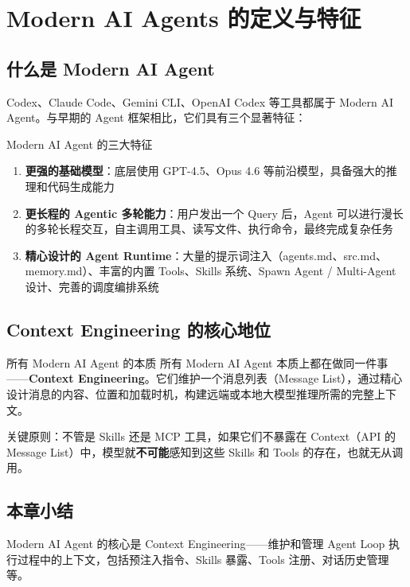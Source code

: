 \section{Modern AI Agents 的定义与特征}

\subsection{什么是 Modern AI Agent}

Codex、Claude Code、Gemini CLI、OpenAI Codex 等工具都属于 Modern AI Agent。与早期的 Agent 框架相比，它们具有三个显著特征：

\begin{importantbox}{Modern AI Agent 的三大特征}
\begin{enumerate}
    \item \textbf{更强的基础模型}：底层使用 GPT-4.5、Opus 4.6 等前沿模型，具备强大的推理和代码生成能力
    \item \textbf{更长程的 Agentic 多轮能力}：用户发出一个 Query 后，Agent 可以进行漫长的多轮长程交互，自主调用工具、读写文件、执行命令，最终完成复杂任务
    \item \textbf{精心设计的 Agent Runtime}：大量的提示词注入（agents.md、src.md、memory.md）、丰富的内置 Tools、Skills 系统、Spawn Agent / Multi-Agent 设计、完善的调度编排系统
\end{enumerate}
\end{importantbox}

\subsection{Context Engineering 的核心地位}

\begin{importantbox}{所有 Modern AI Agent 的本质}
所有 Modern AI Agent 本质上都在做同一件事——\textbf{Context Engineering}。它们维护一个消息列表（Message List），通过精心设计消息的内容、位置和加载时机，构建远端或本地大模型推理所需的完整上下文。

关键原则：不管是 Skills 还是 MCP 工具，如果它们不暴露在 Context（API 的 Message List）中，模型就\textbf{不可能}感知到这些 Skills 和 Tools 的存在，也就无从调用。
\end{importantbox}

\subsection{本章小结}

Modern AI Agent 的核心是 Context Engineering——维护和管理 Agent Loop 执行过程中的上下文，包括预注入指令、Skills 暴露、Tools 注册、对话历史管理等。


